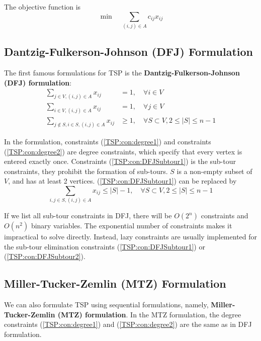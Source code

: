         The objective function is
        \begin{equation}
            \min \quad \sum_{(i, j)\in A} c_{ij}x_{ij}
        \end{equation}

        \subsection{Dantzig-Fulkerson-Johnson (DFJ) Formulation}
            The first famous formulations for TSP is the \textbf{Dantzig-Fulkerson-Johnson (DFJ) formulation}:
            \begin{align}
                \sum_{j \in V, (i,j)\in A} x_{ij} & = 1, \quad \forall i \in V \label{TSP:con:degree1}\\
                \sum_{i \in V, (i,j)\in A} x_{ij} & = 1, \quad \forall j \in V \label{TSP:con:degree2}\\
                \sum_{j\notin S, i\in S, (i,j)\in A} x_{ij} & \ge 1, \quad \forall S \subset V, 2\le |S| \le n-1 \label{TSP:con:DFJSubtour1}
            \end{align}

            In the formulation, constraints (\ref{TSP:con:degree1}) and constraints (\ref{TSP:con:degree2}) are degree constraints, which specify that every vertex is entered exactly once. Constraints (\ref{TSP:con:DFJSubtour1}) is the sub-tour constraints, they prohibit the formation of sub-tours. $S$ is a non-empty subset of $V$, and has at least 2 vertices. (\ref{TSP:con:DFJSubtour1}) can be replaced by
            \begin{equation}
                \sum_{i, j \in S, (i, j) \in A} x_{ij} \le |S| - 1, \quad \forall S \subset V, 2\le |S| \le n-1\label{TSP:con:DFJSubtour2}
            \end{equation}

            If we list all sub-tour constraints in DFJ, there will be $O(2^n)$ constraints and $O(n^2)$ binary variables. The exponential number of constraints makes it impractical to solve directly. Instead, lazy constraints are usually implemented for the sub-tour elimination constraints (\ref{TSP:con:DFJSubtour1}) or (\ref{TSP:con:DFJSubtour2}).

        \subsection{Miller-Tucker-Zemlin (MTZ) Formulation}
            We can also formulate TSP using sequential formulations, namely, \textbf{Miller-Tucker-Zemlin (MTZ) formulation}. In the MTZ formulation, the degree constraints (\ref{TSP:con:degree1}) and (\ref{TSP:con:degree2}) are the same as in DFJ formulation.

